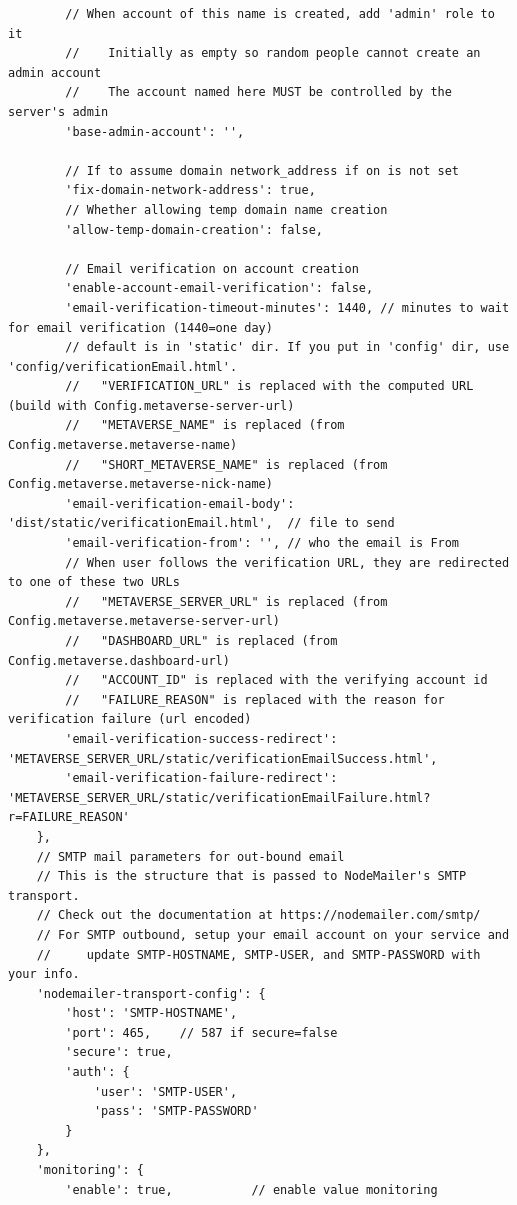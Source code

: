\begin{verbatim}
        // When account of this name is created, add 'admin' role to it
        //    Initially as empty so random people cannot create an admin account
        //    The account named here MUST be controlled by the server's admin
        'base-admin-account': '',

        // If to assume domain network_address if on is not set
        'fix-domain-network-address': true,
        // Whether allowing temp domain name creation
        'allow-temp-domain-creation': false,

        // Email verification on account creation
        'enable-account-email-verification': false,
        'email-verification-timeout-minutes': 1440, // minutes to wait for email verification (1440=one day)
        // default is in 'static' dir. If you put in 'config' dir, use 'config/verificationEmail.html'.
        //   "VERIFICATION_URL" is replaced with the computed URL (build with Config.metaverse-server-url)
        //   "METAVERSE_NAME" is replaced (from Config.metaverse.metaverse-name)
        //   "SHORT_METAVERSE_NAME" is replaced (from Config.metaverse.metaverse-nick-name)
        'email-verification-email-body': 'dist/static/verificationEmail.html',  // file to send
        'email-verification-from': '', // who the email is From
        // When user follows the verification URL, they are redirected to one of these two URLs
        //   "METAVERSE_SERVER_URL" is replaced (from Config.metaverse.metaverse-server-url)
        //   "DASHBOARD_URL" is replaced (from Config.metaverse.dashboard-url)
        //   "ACCOUNT_ID" is replaced with the verifying account id
        //   "FAILURE_REASON" is replaced with the reason for verification failure (url encoded)
        'email-verification-success-redirect': 'METAVERSE_SERVER_URL/static/verificationEmailSuccess.html',
        'email-verification-failure-redirect': 'METAVERSE_SERVER_URL/static/verificationEmailFailure.html?r=FAILURE_REASON'
    },
    // SMTP mail parameters for out-bound email
    // This is the structure that is passed to NodeMailer's SMTP transport.
    // Check out the documentation at https://nodemailer.com/smtp/
    // For SMTP outbound, setup your email account on your service and
    //     update SMTP-HOSTNAME, SMTP-USER, and SMTP-PASSWORD with your info.
    'nodemailer-transport-config': {
        'host': 'SMTP-HOSTNAME',
        'port': 465,    // 587 if secure=false
        'secure': true,
        'auth': {
            'user': 'SMTP-USER',
            'pass': 'SMTP-PASSWORD'
        }
    },
    'monitoring': {
        'enable': true,           // enable value monitoring

\end{verbatim}

